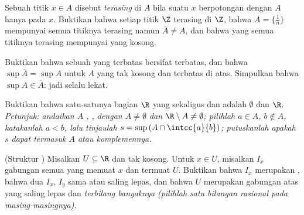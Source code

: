 \begin{exercise}[$\star\star$]\label{exo:b1:topology:7}
Sebuah titik $x \in A$ disebut \emph{terasing} di $A$ bila suatu 
$x$ berpotongan dengan $A$ hanya pada $x$. Buktikan bahwa setiap titik $\Z$ terasing
di $\Z$, bahwa $A = \{\frac1n\}$ mempunyai semua titiknya terasing namun
$\overline A \neq A$, dan bahwa  yang semua titiknya terasing
mempunyai  yang kosong.
\end{exercise}

\begin{exercise}[$\star\star$]\label{exo:b1:topology:8}
Buktikan bahwa  sebuah  yang terbatas bersifat terbatas, dan bahwa
$\sup \overline A = \sup A$ untuk $A$ yang tak kosong dan terbatas di atas. Simpulkan
bahwa $\sup A \in \overline A$: jadi  selalu lekat.
\end{exercise}

\begin{exercise}[$\star\star\star$]\label{exo:b1:topology:9}
Buktikan bahwa satu-satunya  bagian $\R$ yang sekaligus  dan  adalah
$\emptyset$ dan $\R$. \emph{Petunjuk: andaikan $A$ , , dengan
$A \neq \emptyset$ dan $\R \setminus A \neq \emptyset$; pilihlah $a \in
A$, $b \notin A$, katakanlah $a < b$, lalu tinjaulah $s = \sup\,(A \cap
\intcc{a}{b})$; putuskanlah apakah $s$ dapat termasuk $A$ atau
komplemennya.}
\end{exercise}

\begin{exercise}[$\star\star\star$]\label{exo:b1:topology:10}
(Struktur ) Misalkan $U \subseteq \R$  dan tak kosong. Untuk
$x \in U$, misalkan $I_x$ gabungan semua   yang memuat
$x$ dan termuat $U$. Buktikan bahwa $I_x$ merupakan  , bahwa
dua  $I_x$, $I_y$ sama atau saling lepas, dan bahwa $U$ merupakan gabungan
atas   yang saling lepas dan \emph{terbilang banyaknya} \emph{(pilihlah
satu bilangan rasional pada masing-masingnya)}.
\end{exercise}


